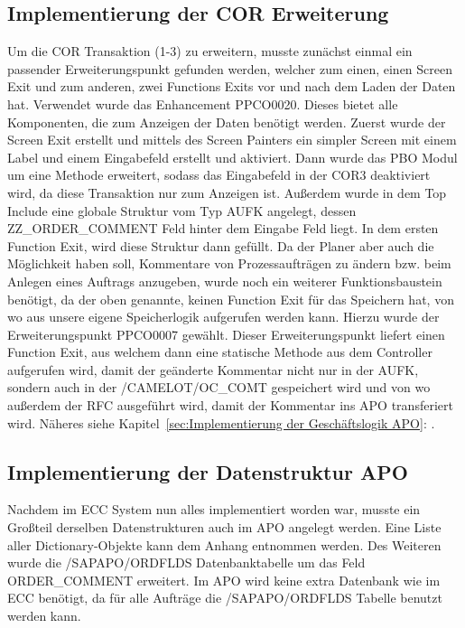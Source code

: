 \subsection{Implementierung der COR Erweiterung}
\label{sec:Implementierung der COR Erweiterung}   
Um die COR Transaktion (1-3) zu erweitern, musste zunächst einmal ein passender Erweiterungspunkt gefunden werden, welcher zum einen, einen Screen Exit und zum anderen, zwei Functions Exits vor und nach dem Laden der Daten hat. Verwendet wurde das Enhancement PPCO0020. Dieses bietet alle Komponenten, die zum Anzeigen der Daten benötigt werden. Zuerst wurde der Screen Exit erstellt und mittels des Screen Painters ein simpler Screen mit einem Label und einem Eingabefeld erstellt und aktiviert. Dann wurde das \ac{PBO} Modul um eine Methode erweitert, sodass das Eingabefeld in der COR3 deaktiviert wird, da diese Transaktion nur zum Anzeigen ist. Außerdem wurde in dem Top Include eine globale Struktur vom Typ AUFK angelegt, dessen ZZ\_ORDER\_COMMENT Feld hinter dem Eingabe Feld liegt. In dem ersten Function Exit, wird diese Struktur dann gefüllt. Da der Planer aber auch die Möglichkeit haben soll, Kommentare von Prozessaufträgen zu ändern bzw. beim Anlegen eines Auftrags anzugeben, wurde noch ein weiterer Funktionsbaustein benötigt, da der oben genannte, keinen Function Exit für das Speichern hat, von wo aus unsere eigene Speicherlogik aufgerufen werden kann. Hierzu wurde der Erweiterungspunkt PPCO0007 gewählt. Dieser Erweiterungspunkt liefert einen Function Exit, aus welchem dann eine statische Methode aus dem Controller aufgerufen wird, damit der geänderte Kommentar nicht nur in der AUFK, sondern auch in der /CAMELOT/OC\_COMT gespeichert wird und von wo außerdem der \ac{RFC} ausgeführt wird, damit der Kommentar ins \ac{APO} transferiert wird. Näheres siehe Kapitel~\ref{sec:Implementierung der Geschäftslogik APO}: .

\subsection{Implementierung der Datenstruktur APO}
\label{sec:Implementierung der Datenstruktur APO} 
Nachdem im \ac{ECC} System nun alles implementiert worden war, musste ein Großteil derselben Datenstrukturen auch im \ac{APO} angelegt werden. Eine Liste aller Dictionary-Objekte kann dem Anhang entnommen werden. Des Weiteren wurde die /SAPAPO/ORDFLDS Datenbanktabelle um das Feld ORDER\_COMMENT erweitert. Im \ac{APO} wird keine extra Datenbank wie im \ac{ECC} benötigt, da für alle Aufträge die /SAPAPO/ORDFLDS Tabelle benutzt werden kann.

